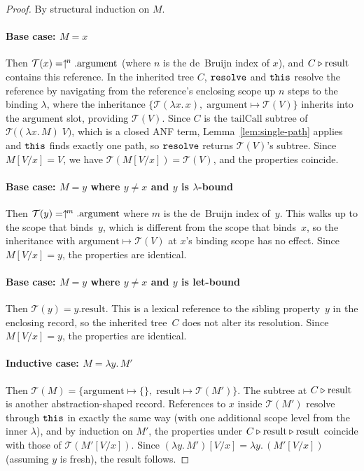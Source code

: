 \begin{proof}
  By structural induction on $M$.

  \paragraph{Base case: $M = x$}
  Then $\mathcal{T}(x) =
  \uparrow^{\!n}.\mathrm{argument}$ (where $n$ is the de~Bruijn index
  of $x$), and
  $C \mathbin{\triangleright} \mathrm{result}$ contains this reference.
  In the inherited tree $C$, $\mathtt{resolve}$ and $\mathtt{this}$ resolve the reference by
  navigating from the reference's enclosing scope up $n$ steps
  to the binding $\lambda$, where the inheritance
  $\{\mathcal{T}(\lambda x.\, x),\;
  \mathrm{argument} \mapsto \mathcal{T}(V)\}$ inherits into the
  $\mathrm{argument}$ slot, providing $\mathcal{T}(V)$.
  Since $C$ is the $\mathrm{tailCall}$ subtree of
  $\mathcal{T}\bigl((\lambda x.\, M)\; V\bigr)$, which is a
  closed ANF term, Lemma~\ref{lem:single-path} applies and
  $\mathtt{this}$ finds exactly one path,
  so $\mathtt{resolve}$ returns $\mathcal{T}(V)$'s subtree.
  Since $M[V/x] = V$, we have
  $\mathcal{T}(M[V/x]) = \mathcal{T}(V)$, and the properties
  coincide.

  \paragraph{Base case: $M = y$ where $y \neq x$ and $y$ is
  $\lambda$-bound}
  Then $\mathcal{T}(y) = \uparrow^{\!m}.\mathrm{argument}$ where $m$
  is the de~Bruijn index of~$y$.
  This walks up to the scope that binds~$y$, which is different
  from the scope that binds~$x$, so the inheritance with
  $\mathrm{argument} \mapsto \mathcal{T}(V)$ at $x$'s binding
  scope has no effect.
  Since $M[V/x] = y$, the properties are identical.

  \paragraph{Base case: $M = y$ where $y \neq x$ and $y$ is
  let-bound}
  Then $\mathcal{T}(y) = y.\mathrm{result}$.
  This is a lexical reference to the sibling property~$y$ in the
  enclosing record, so the inherited tree~$C$ does not alter its
  resolution.
  Since $M[V/x] = y$, the properties are identical.

  \paragraph{Inductive case: $M = \lambda y.\, M'$}
  Then $\mathcal{T}(M) =
  \{\mathrm{argument} \mapsto \{\},\;
  \mathrm{result} \mapsto \mathcal{T}(M')\}$.
  The subtree at $C \mathbin{\triangleright} \mathrm{result}$ is another
  abstraction-shaped record.
  References to $x$ inside $\mathcal{T}(M')$ resolve through
  $\mathtt{this}$ in exactly the same way (with one additional scope
  level from the inner $\lambda$), and by induction on $M'$, the
  properties under
  $C \mathbin{\triangleright} \mathrm{result} \mathbin{\triangleright} \mathrm{result}$
  coincide with those of
  $\mathcal{T}(M'[V/x])$.
  Since
  $(\lambda y.\, M')[V/x] = \lambda y.\, (M'[V/x])$
  (assuming $y$ is fresh), the result follows.


\end{proof}
